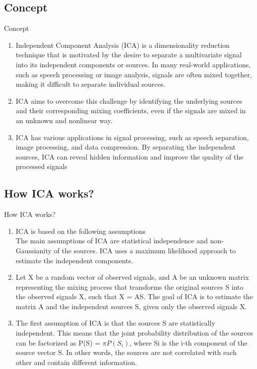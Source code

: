 \documentclass{beamer}
\begin{document}
\subsection{Concept}
\begin{frame}{Concept}
    \begin{enumerate}
        \item Independent Component Analysis (ICA) is a dimensionality reduction technique that is motivated by the desire to separate a multivariate signal into its independent components or sources. In many real-world applications, such as speech processing or image analysis, signals are often mixed together, making it difficult to separate individual sources.
        \item  ICA aims to overcome this challenge by identifying the underlying sources and their corresponding mixing coefficients, even if the signals are mixed in an unknown and nonlinear way.
        \item ICA has various applications in signal processing, such as speech separation, image processing, and data compression. By separating the independent sources, ICA can reveal hidden information and improve the quality of the processed signals
    \end{enumerate}
\end{frame}

\subsection{How ICA works?}
\begin{frame}{How ICA works?}
    \begin{enumerate}
        \item ICA is based on the following assumptions\\
              The main assumptions of ICA are statistical independence and non-Gaussianity of the sources. ICA uses a maximum likelihood approach to estimate the independent components.
        \item Let X be a random vector of observed signals, and A be an unknown matrix representing the mixing process that transforms the original sources S into the observed signals X, such that X = AS. The goal of ICA is to estimate the matrix A and the independent sources S, given only the observed signals X.
        \item The first assumption of ICA is that the sources S are statistically independent. This means that the joint probability distribution of the sources can be factorized as P(S) = $\pi P(S_i)$, where Si is the i-th component of the source vector S. In other words, the sources are not correlated with each other and contain different information.

    \end{enumerate}
\end{frame}
\end{document}
